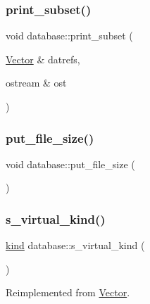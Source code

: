 \mbox{\label{classdatabase_a8b454f5428b3f00a2de497f21d73f3fa}} 
\subsubsection{\texorpdfstring{print\+\_\+subset()}{print\_subset()}}
{\footnotesize\ttfamily void database\+::print\+\_\+subset (\begin{DoxyParamCaption}\item[{\mbox{\hyperlink{class_vector}{Vector}} \&}]{datrefs,  }\item[{ostream \&}]{ost }\end{DoxyParamCaption})}

\mbox{\label{classdatabase_a3490df2b9feac3d2cfab8a5d00033ab4}} 
\subsubsection{\texorpdfstring{put\+\_\+file\+\_\+size()}{put\_file\_size()}}
{\footnotesize\ttfamily void database\+::put\+\_\+file\+\_\+size (\begin{DoxyParamCaption}{ }\end{DoxyParamCaption})}

\mbox{\label{classdatabase_a30a79d9d1ae22f160368de28625ddeba}} 
\subsubsection{\texorpdfstring{s\+\_\+virtual\+\_\+kind()}{s\_virtual\_kind()}}
{\footnotesize\ttfamily \mbox{\hyperlink{discreta_8h_aaf25ee7e2306d78c74ec7bc48f092e81}{kind}} database\+::s\+\_\+virtual\+\_\+kind (\begin{DoxyParamCaption}{ }\end{DoxyParamCaption})\hspace{0.3cm}{\ttfamily [virtual]}}



Reimplemented from \mbox{\hyperlink{class_vector_a20550e70d02cbe484032c7f6b0833a0f}{Vector}}.

